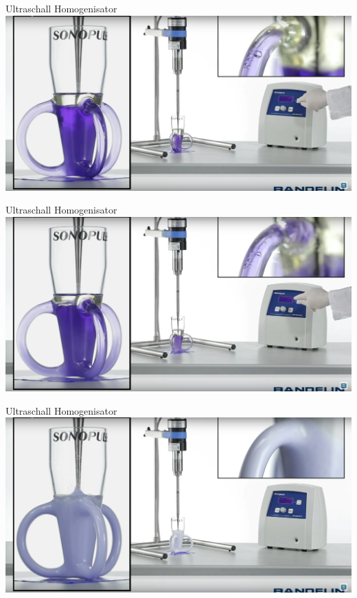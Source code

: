 \documentclass{beamer} %
\begin{document}
\begin{frame}{Ultraschall Homogenisator}
	\centering
	\includegraphics[width=\linewidth]{Markus/uh4}
\end{frame}
\begin{frame}{Ultraschall Homogenisator}
	\centering
	\includegraphics[width=\linewidth]{Markus/uh5}
\end{frame}
\begin{frame}{Ultraschall Homogenisator}
	\centering
	\includegraphics[width=\linewidth]{Markus/uh6}
\end{frame}
\end{document}
